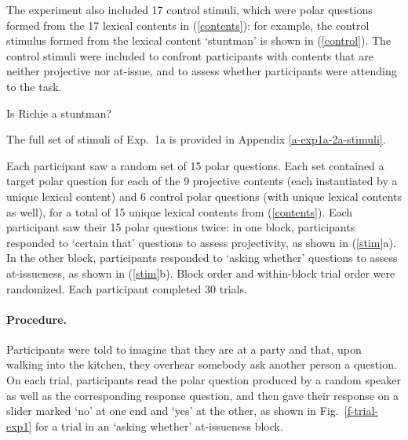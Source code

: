\documentclass[11pt,fleqn]{article}
\newcommand{\6}{\mbox{$[\hspace*{-.6mm}[$}}
\newcommand{\9}{\mbox{$]\hspace*{-.6mm}]$}}
\newcommand{\figref}[1]{Fig.~\ref{#1}}
\begin{document}
The experiment also included 17 control stimuli, which were polar questions formed from the 17 lexical contents in (\ref{contents}): for example, the control stimulus formed from the lexical content `stuntman' is shown in (\ref{control}). The control stimuli were included to confront participants with contents that are neither projective nor at-issue, and to assess whether participants were attending to the task. 

\begin{exe}
\ex\label{control} Is Richie a stuntman?
\end{exe}
The full set of stimuli of Exp.~1a is provided in Appendix \ref{a-exp1a-2a-stimuli}.

Each participant saw a random set of 15 polar questions. Each set contained a target polar question for each of the 9 projective contents (each instantiated by a unique lexical content) and 6 control polar questions (with unique lexical contents as well), for a total of 15 unique lexical contents from (\ref{contents}). Each participant saw their 15 polar questions twice: in one block, participants responded to `certain that' questions to assess projectivity, as shown in (\ref{stim}a). In the other block, participants responded to `asking whether' questions to assess at-issueness, as shown in (\ref{stim}b). Block order and within-block trial order were randomized. Each participant completed 30 trials.

\paragraph{Procedure.} Participants were told to imagine that they are at a party and that, upon walking into the kitchen, they overhear somebody ask another person a question. On each trial, participants read the polar question produced by a random speaker as well as the corresponding response question, and then gave their response on a slider marked `no' at one end and `yes' at the other, as shown in \figref{f-trial-exp1} for a trial in an `asking whether' at-issueness block.  
\end{document}
